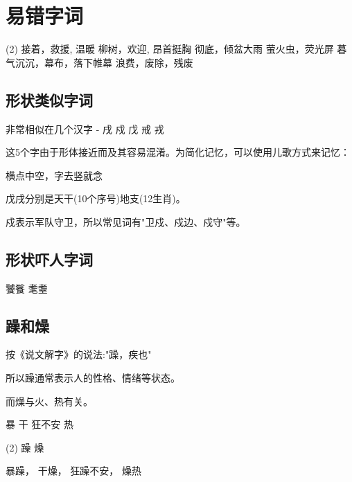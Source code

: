 
\section{易错字词}

\begin{tasks}[style=enumerate](2)
    \task 接着，救援, 温暖
    \task 柳树，欢迎, 昂首挺胸
    \task 彻底，倾盆大雨
    \task 萤火虫，荧光屏
    \task 暮气沉沉，幕布，落下帷幕
    \task 浪费，废除，残废
\end{tasks}

  \subsection{形状类似字词}
非常相似在几个汉字 - 戌 戍 戊 戒 戎

这5个字由于形体接近而及其容易混淆。为简化记忆，可以使用儿歌方式来记忆：

  \begin{center}横点中空，字去竖就念\end{center}

  戊戌分别是天干(10个序号)地支(12生肖)。

  戍表示军队守卫，所以常见词有"卫戍、戍边、戍守"等。

  \subsection{形状吓人字词}
饕餮 耄耋

  \subsection{躁和燥} 
按《说文解字》的说法:"躁，疾也"

所以躁通常表示人的性格、情绪等状态。

而燥与火、热有关。

\begin{question}
  暴\blank[width=1cm]{} \hspace{1cm} 干\blank[width=1cm]{}\hspace{1cm}  狂\blank[width=1cm]{}不安 \hspace{1cm}\blank[width=1cm]{}热

  \begin{tasks}(2)
    \task 躁  \task 燥
  \end{tasks}

\end{question}
\begin{solution}
  暴躁， 干燥， 狂躁不安， 燥热
\end{solution}

